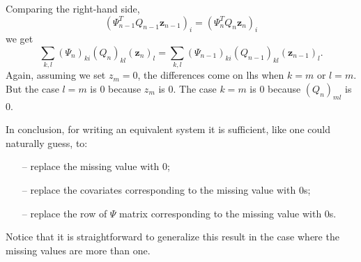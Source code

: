Comparing the right-hand side,
\begin{equation}
	\left( \Psi_{n-1}^T Q_{n-1}\bm{z}_{n-1}\right)_i =
	\left( \Psi_{n}^T Q_{n}\bm{z}_{n}\right)_i
\end{equation}
we get
\begin{equation}
	\sum_{k,l} \left( \Psi_{n}\right)_{ki} \left(  Q_{n} \right)_{kl} \left( \bm{z}_{n} \right)_l
	=
	\sum_{k,l} \left( \Psi_{n-1}\right)_{ki} \left(  Q_{n-1} \right)_{kl} \left( \bm{z}_{n-1} \right)_l .
\end{equation}
Again, assuming we set $z_m=0$, the differences come on lhs when
$k=m$ or $l=m$. But the case $l=m$ is 0 because $z_m$ is $0$. The case $k=m$ is
0 because $\left( Q_n\right)_{ml}$ is 0.

In conclusion, for writing an equivalent system it is sufficient, like one
could naturally guess, to:
\begin{itemize}
	\item[--] replace the missing value with $0$;
	\item[--] replace the covariates corresponding to the missing value with $0$s;
	\item[--] replace the row of $\Psi$ matrix corresponding to the missing value with $0$s.
\end{itemize}
Notice that it is straightforward to generalize this result in the
case where the missing values are more than one.
